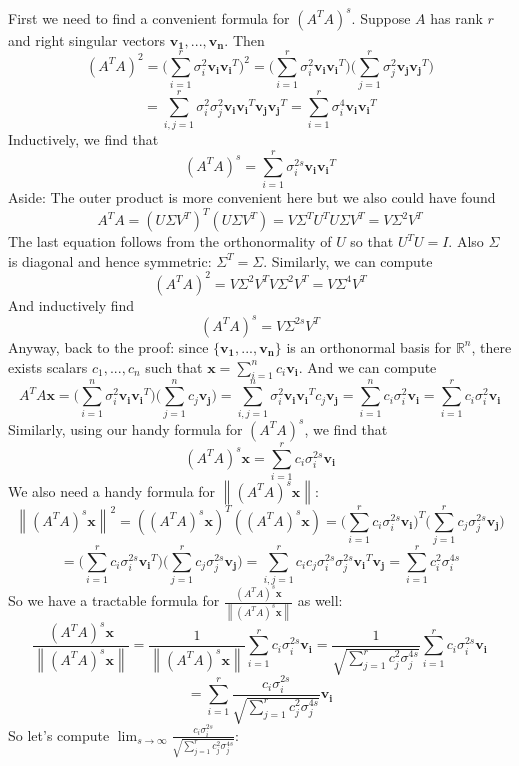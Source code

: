 \documentclass{tufte-handout}
\newcommand{\norm}[1]{\left\lVert#1\right\rVert}
\begin{document}
\noindent First we need to find a convenient formula for $(A^TA)^s$. Suppose $A$ has rank $r$ and right singular vectors $\mathbf{v_1},...,\mathbf{v_n}$. Then 
\[
(A^TA)^2=\Big(\sum_{i=1}^{r}\sigma_i^2\mathbf{v_i}\mathbf{v_i}^T\Big)^2
=
\Big(\sum_{i=1}^{r}\sigma_i^2\mathbf{v_i}\mathbf{v_i}^T\Big)
\Big(\sum_{j=1}^{r}\sigma_j^2\mathbf{v_j}\mathbf{v_j}^T\Big)
\]
\[
=
\sum_{i,j=1}^{r}\sigma_i^2\sigma_j^2\mathbf{v_i}\mathbf{v_i}^T\mathbf{v_j}\mathbf{v_j}^T
=
\sum_{i=1}^{r}\sigma_i^4\mathbf{v_i}\mathbf{v_i}^T
\]
Inductively, we find that
\[
(A^TA)^s=
\sum_{i=1}^{r}\sigma_i^{2s}\mathbf{v_i}\mathbf{v_i}^T
\]
\noindent Aside: The outer product is more convenient here but we also could have found
\[
A^TA=(U\Sigma V^T)^T(U\Sigma V^T)=V\Sigma^TU^TU\Sigma V^T=V\Sigma^2V^T
\]
The last equation follows from the orthonormality of $U$ so that $U^TU=I$. Also $\Sigma$ is diagonal and hence symmetric: $\Sigma^T=\Sigma$. Similarly, we can compute
\[
(A^TA)^2=V\Sigma^2V^TV\Sigma^2V^T=V\Sigma^4V^T
\]
And inductively find
\[
(A^TA)^s=V\Sigma^{2s}V^T
\]
\noindent Anyway, back to the proof: since $\{\mathbf{v_1},...,\mathbf{v_n}\}$ is an orthonormal basis for $\mathbb{R}^n$, there exists scalars $c_1,...,c_n$ such that $\mathbf{x}=\sum_{i=1}^nc_i\mathbf{v_i}$. And we can compute
\[
A^TA\mathbf{x}=
\Big(\sum_{i=1}^{n}\sigma_i^2\mathbf{v_i}\mathbf{v_i}^T\Big)\Big(\sum_{j=1}^nc_j\mathbf{v_j}\Big)
=
\sum_{i,j=1}^{n}\sigma_i^2\mathbf{v_i}\mathbf{v_i}^Tc_j\mathbf{v_j}
=
\sum_{i=1}^nc_i\sigma_{i}^2\mathbf{v_i}
=
\sum_{i=1}^rc_i\sigma_{i}^2\mathbf{v_i}
\]
Similarly, using our handy formula for $(A^TA)^s$, we find that
\[
(A^TA)^s\mathbf{x}=
\sum_{i=1}^rc_i\sigma_{i}^{2s}\mathbf{v_i}
\]
We also need a handy formula for $\norm{(A^TA)^s\mathbf{x}}$:
\[
\norm{(A^TA)^s\mathbf{x}}^2=
((A^TA)^s\mathbf{x})^T((A^TA)^s\mathbf{x})
=
\Big(\sum_{i=1}^rc_i\sigma_{i}^{2s}\mathbf{v_i}\Big)^T\Big(\sum_{j=1}^rc_j\sigma_{j}^{2s}\mathbf{v_j}\Big)
\]
\[
=
\Big(\sum_{i=1}^rc_i\sigma_{i}^{2s}\mathbf{v_i}^T\Big)\Big(\sum_{j=1}^rc_j\sigma_{j}^{2s}\mathbf{v_j}\Big)
=
\sum_{i,j=1}^rc_ic_j\sigma_{i}^{2s}\sigma_{j}^{2s}\mathbf{v_i}^T\mathbf{v_j}
=\sum_{i=1}^rc_i^2\sigma_{i}^{4s}
\]
So we have a tractable formula for $\frac{(A^TA)^s\mathbf{x}}{\norm{(A^TA)^s\mathbf{x}}}$ as well:
\[
\frac{(A^TA)^s\mathbf{x}}{\norm{(A^TA)^s\mathbf{x}}}
=
\frac{1}{\norm{(A^TA)^s\mathbf{x}}}\sum_{i=1}^rc_i\sigma_{i}^{2s}\mathbf{v_i}
=
\frac{1}{\sqrt{\sum_{j=1}^rc_j^2\sigma_{j}^{4s}}}\sum_{i=1}^rc_i\sigma_{i}^{2s}\mathbf{v_i}
\]
\[
=
\sum_{i=1}^r\frac{c_i\sigma_{i}^{2s}}{\sqrt{\sum_{j=1}^rc_j^2\sigma_{j}^{4s}}}\mathbf{v_i}
\]
So let's compute $\lim_{s\rightarrow\infty}\frac{c_i\sigma_{i}^{2s}}{\sqrt{\sum_{j=1}^rc_j^2\sigma_{j}^{4s}}}$:
\end{document}
